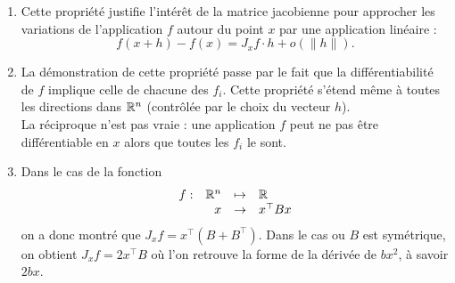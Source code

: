 \remarks
\begin{enumerate}
  \item Cette propriété justifie l'intérêt de la matrice jacobienne pour approcher les variations de l'application $f$ autour du point $x$ par une application linéaire : 
  $$
  f(x+h) - f(x) = J_xf \cdot h + o(\|h\|).
  $$
  \item La démonstration de cette propriété passe par le fait que la différentiabilité de $f$ implique celle de chacune des $f_i$. Cette propriété s'étend même à toutes les directions dans $\mathbb{R}^n$ (contrôlée par le choix du vecteur $h$). \\
  La réciproque n'est pas vraie : une application $f$ peut ne pas être différentiable en $x$ alors que toutes les $f_i$ le sont.
  \item Dans le cas de la fonction
  $$
  \begin{array}{rrcl}
    f : & \mathbb{R}^n & \mapsto & \mathbb{R} \\
    & x & \to & x^\top B x
  \end{array}
  $$
  on a donc montré que $J_x f = x^\top (B + B^\top)$. Dans le cas ou $B$ est symétrique, on obtient $J_x f = 2 x^\top B$ où l'on retrouve la forme de la dérivée de $bx^2$, à savoir $2 bx$.

\end{enumerate}

